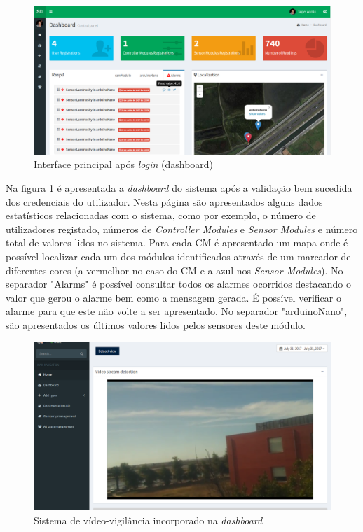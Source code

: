 \begin{figure}[h]
	\centering
	\includegraphics[width=0.9\linewidth]{prints-web/dashboard1.png}
	\caption{Interface principal após \textit{login} (dashboard)}
	\label{ddashboard}
\end{figure}



Na figura \ref{ddashboard} é apresentada a \textit{dashboard} do sistema após a validação bem sucedida dos credenciais do utilizador. Nesta página são apresentados alguns dados estatísticos relacionadas com o sistema, como por exemplo, o número de utilizadores registado, números de \textit{Controller Modules} e \textit{Sensor Modules} e número total de valores lidos no sistema. Para cada \acl{CM} é apresentado um mapa onde é possível localizar cada um dos módulos identificados através de um marcador de diferentes cores (a vermelhor no caso do \acl{CM} e a azul nos \textit{Sensor Modules}). No separador "Alarms" é possível consultar todos os alarmes ocorridos destacando o valor que gerou o alarme bem como a mensagem gerada. É possível verificar o alarme para que este não volte a ser apresentado. No separador "arduinoNano", são apresentados os últimos valores lidos pelos sensores deste módulo. 


\begin{figure}[h]
	\centering
	\includegraphics[width=0.7\linewidth]{prints-web/stream.png}
	\caption{Sistema de vídeo-vigilância incorporado na \textit{dashboard}}
	\label{vigilancia}
\end{figure}







